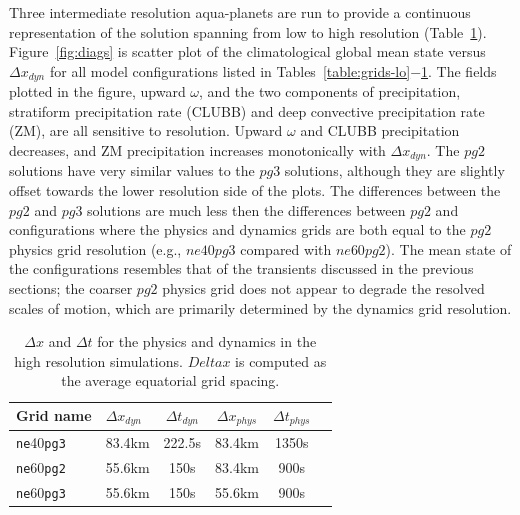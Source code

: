 \documentclass{agujournal}
\begin{document}
Three intermediate resolution aqua-planets are run to provide a continuous representation of the solution spanning from low to high resolution (Table~\ref{table:grids-med}). Figure~\ref{fig:diags} is scatter plot of the climatological global mean state versus $\Delta x_{dyn}$ for all model configurations listed in Tables~\ref{table:grids-lo}$-$\ref{table:grids-med}. The fields plotted in the figure, upward $\omega$, and the two components of precipitation, stratiform precipitation rate (CLUBB) and deep convective precipitation rate (ZM), are all sensitive to resolution. Upward $\omega$ and CLUBB precipitation decreases, and ZM precipitation increases monotonically with $\Delta x_{dyn}$. The $pg2$ solutions have very similar values to the $pg3$ solutions, although they are slightly offset towards the lower resolution side of the plots. The differences between the $pg2$ and $pg3$ solutions are much less then the differences between $pg2$ and configurations where the physics and dynamics grids are both equal to the $pg2$ physics grid resolution (e.g., $ne40pg3$ compared with $ne60pg2$). The mean state of the configurations resembles that of the transients discussed in the previous sections; the coarser $pg2$ physics grid does not appear to degrade the resolved scales of motion, which are primarily determined by the dynamics grid resolution.

 \begin{table}
 \caption{$\Delta x$ and $\Delta t$ for the physics and dynamics in the high resolution simulations. $Delta x$ is computed as the average equatorial grid spacing.}
 \centering
 \begin{tabular}{llcccc}
 \hline
 Grid name & $\Delta x_{dyn}$  & $\Delta t_{dyn}$ & $\Delta x_{phys}$  & $\Delta t_{phys}$ \\
 \hline
   {\tt{ne}}40{\tt{pg3}}  & 83.4km & 222.5s  & 83.4km & 1350s \\
   {\tt{ne}}60{\tt{pg2}}  & 55.6km & 150s  & 83.4km & 900s \\
   {\tt{ne}}60{\tt{pg3}}  & 55.6km & 150s  & 55.6km & 900s \\
 \hline
 \end{tabular}
 \label{table:grids-med}
 \end{table}
\end{document}
